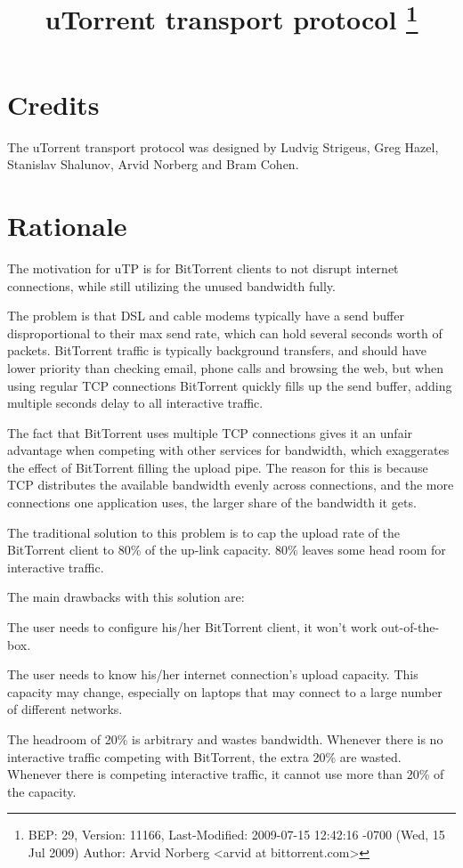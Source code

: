 \documentclass[11pt,a4paper,oneside,draft]{article}
\begin{document}
\title{
  uTorrent transport protocol
  \footnote{
    BEP: 29, Version:  11166, Last-Modified: 2009-07-15 12:42:16 -0700 (Wed, 15 Jul 2009)
    Author: Arvid Norberg <arvid at bittorrent.com>
  }
}
\maketitle
\tableofcontents
\pagebreak

\setlength{\parskip}{1ex plus 0.5ex minus 0.2ex}

{\section {Credits}}
The uTorrent transport protocol was designed by Ludvig Strigeus, Greg Hazel, Stanislav Shalunov, Arvid Norberg and Bram Cohen.

{\section {Rationale}}

The motivation for uTP is for BitTorrent clients to not disrupt internet connections, while still utilizing the unused bandwidth fully.

The problem is that DSL and cable modems typically have a send buffer disproportional to their max send rate, which can hold several seconds worth of packets. BitTorrent traffic is typically background transfers, and should have lower priority than checking email, phone calls and browsing the web, but when using regular TCP connections BitTorrent quickly fills up the send buffer, adding multiple seconds delay to all interactive traffic.

The fact that BitTorrent uses multiple TCP connections gives it an unfair advantage when competing with other services for bandwidth, which exaggerates the effect of BitTorrent filling the upload pipe. The reason for this is because TCP distributes the available bandwidth evenly across connections, and the more connections one application uses, the larger share of the bandwidth it gets.

The traditional solution to this problem is to cap the upload rate of the BitTorrent client to 80\% of the up-link capacity. 80\% leaves some head room for interactive traffic.

The main drawbacks with this solution are:
{\begin{enumerate}
  {\item The user needs to configure his/her BitTorrent client, it won't work out-of-the-box.}
  {\item The user needs to know his/her internet connection's upload capacity. This capacity may change, especially on laptops that may connect to a large number of different networks.}
  {\item The headroom of 20\% is arbitrary and wastes bandwidth. Whenever there is no interactive traffic competing with BitTorrent, the extra 20\% are wasted. Whenever there is competing interactive traffic, it cannot use more than 20\% of the capacity.}
\end{enumerate}}
\end{document}
